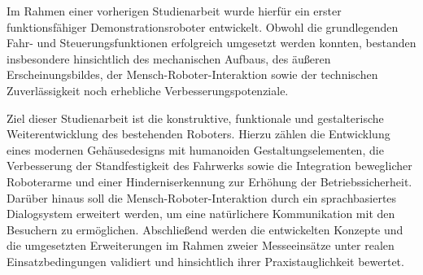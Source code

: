 Im Rahmen einer vorherigen Studienarbeit wurde hierfür ein erster funktionsfähiger Demonstrationsroboter entwickelt. Obwohl die grundlegenden Fahr- und Steuerungsfunktionen erfolgreich umgesetzt werden konnten, bestanden insbesondere hinsichtlich des mechanischen Aufbaus, des äußeren Erscheinungsbildes, der Mensch-Roboter-Interaktion sowie der technischen Zuverlässigkeit noch erhebliche Verbesserungspotenziale.

Ziel dieser Studienarbeit ist die konstruktive, funktionale und gestalterische Weiterentwicklung des bestehenden Roboters. Hierzu zählen die Entwicklung eines modernen Gehäusedesigns mit humanoiden Gestaltungselementen, die Verbesserung der Standfestigkeit des Fahrwerks sowie die Integration beweglicher Roboterarme und einer Hinderniserkennung zur Erhöhung der Betriebssicherheit. Darüber hinaus soll die Mensch-Roboter-Interaktion durch ein sprachbasiertes Dialogsystem erweitert werden, um eine natürlichere Kommunikation mit den Besuchern zu ermöglichen. 
Abschließend werden die entwickelten Konzepte und die umgesetzten Erweiterungen im Rahmen zweier Messeeinsätze unter realen Einsatzbedingungen validiert und hinsichtlich ihrer Praxistauglichkeit bewertet.




